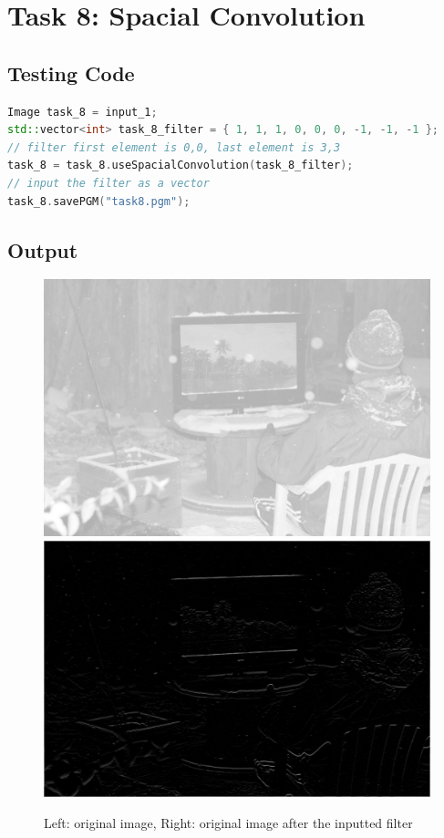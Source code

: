 \documentclass[pdftex,a4paper,10pt,titlepage]{article}
\begin{document}
\pagebreak

\section{Task 8: Spacial Convolution}
\subsection{Testing Code}
\begin{lstlisting}[language=C++]
Image task_8 = input_1;
std::vector<int> task_8_filter = { 1, 1, 1, 0, 0, 0, -1, -1, -1 };
// filter first element is 0,0, last element is 3,3
task_8 = task_8.useSpacialConvolution(task_8_filter);
// input the filter as a vector 
task_8.savePGM("task8.pgm");
\end{lstlisting}

\subsection{Output}
\begin{figure}[h]
\includegraphics[scale=0.225]{snow.png}
\includegraphics[scale=0.225]{task8.png} 
\caption {Left: original image, Right: original image after the inputted filter}
\label{fig:copied_image}
\end{figure}
\end{document}

